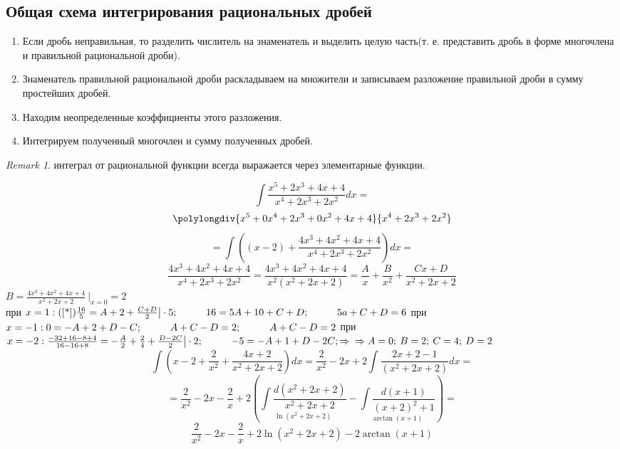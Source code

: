 \documentclass[a4paper,12pt]{bookest}
\theoremstyle{remark}
\newtheorem*{remark}{Remark}
\newcommand\tab[1][1cm]{\hspace*{#1}}
\begin{document}
\subsection{Общая схема интегрирования рациональных дробей}
\begin{enumerate}
	\item Если дробь неправильная, то разделить числитель на знаменатель и выделить целую часть(т. е. представить дробь в форме многочлена и правильной рациональной дроби).
	\item Знаменатель правильной рациональной дроби раскладываем на множители и записываем разложение правильной дроби в сумму простейших дробей.
	\item Находим неопределенные коэффициенты этого разложения.
	\item Интегрируем полученный многочлен и сумму полученных дробей.	  
\end{enumerate}
\begin{remark}
интеграл от рациональной функции всегда выражается через элементарные функции.	
\end{remark}
\begin{example}
	$$\int \frac{x^5+2x^3+4x+4}{x^4+2x^3+2x^2}dx=$$
		\[
    		\polylongdiv{x^5+0x^4+2x^3+0x^2+4x+4}{x^4+2x^3+2x^2}
  		\]
	$$=\int \left((x-2)+\frac{4x^3+4x^2+4x+4}{x^4+2x^3+2x^2}\right)dx=$$
	\begin{equation}\label{*}
		\frac{4x^3+4x^2+4x+4}{x^4+2x^3+2x^2}=\frac{4x^3+4x^2+4x+4}{x^2(x^2+2x+2)}=\frac Ax+\frac B{x^2}+\frac{Cx+D}{x^2+2x+2}
	\end{equation}
	$
	B=\frac{4x^3+4x^2+4x+4}{x^2+2x+2}\>\bigg|_{x=0}=2
	$\\ при $x=1:(\ref{*})\\ \frac {16}{5}=A+2+\frac{C+D}{2}\big|\cdot 5;\tab  16=5A+10+C+D; \tab 5a+C+D=6\\\\$
	при $x=-1:\\ 0= -A+2+D-C;\tab A+C-D=2;\tab A+C-D=2\\\\$
	при $x=-2:\\ \frac{-32+16-8+4}{16-16+8}=-\frac A2+\frac24+\frac{D-2C}{2}\big|\cdot2;\tab -5=-A+1+D-2C;\Rightarrow\\\\\Rightarrow A=0;\>B=2;\>C=4;\>D=2$
	$$\int \left(x-2 +\frac2{x^2}+\frac{4x+2}{x^2+2x+2} \right)dx=\frac2{x^2}-2x+2\int \frac{2x+2-1}{(x^2+2x+2)}dx=$$
	$$=\frac2{x^2}-2x-\frac2x+2\left(\underset{\ln(x^2+2x+2)}{\int \frac{d(x^2+2x+2)}{x^2+2x+2}}-\underset{\arctan (x+1)}{\int\frac{d(x+1)}{(x+2)^2+1}}\right)=$$
	$$\frac2{x^2}-2x-\frac2x+2\ln(x^2+2x+2)-2\arctan (x+1)$$
\end{example}
\end{document}
